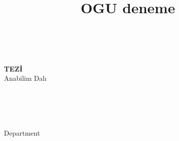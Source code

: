 \documentclass[]{esogu}			%
\begin{document}
\frontmatter %
\title{OGU deneme}
\begin{titlingpage*}
\begin{center}

\vspace*{8cm}								%
	\tbaslik\\								%
	\vspace{1pc}							%
	\yazar	\\								%
	\vspace{1pc}							%
	\textbf{\unvan\space TEZİ}\\
    \vspace{1pc}							%
	\bolum \space Anabilim Dalı\\
    \vspace{1pc}							%
	\teslim\\
\end{center}

\end{titlingpage*}
\begin{titlingpage*}
\begin{center}

\vspace*{8cm}
	\tbasliken\\								%
	\vspace{1pc}
	\yazar	\\								%
	\vspace{1pc}
	\textbf{\unvanen}\\
  	\vspace{1pc}
	\bolumen \space Department\\
	\vspace{1pc}
	\teslimen\\
\end{center}

\end{titlingpage*}
\end{document}
